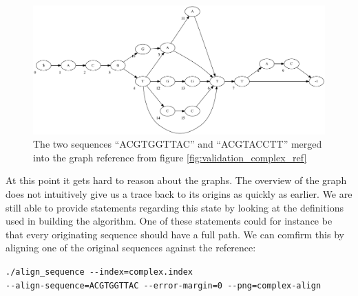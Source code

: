 \documentclass[thesis.tex]{subfiles}
\begin{document}
\begin{figure}[!h]
  \begin{mdframed}
  \includegraphics[width=\textwidth]{output/complex-merge.png}
  \caption{The two sequences ``ACGTGGTTAC'' and ``ACGTACCTT'' merged into the graph reference from figure \ref{fig:validation_complex_ref}}
  \end{mdframed}
\end{figure}
\par\noindent
At this point it gets hard to reason about the graphs. The overview of the graph does not intuitively give us a trace back to its origins as quickly as earlier. We are still able to provide statements regarding this state by looking at the definitions used in building the algorithm. One of these statements could for instance be that every originating sequence should have a full path. We can comfirm this by aligning one of the original sequences against the reference:\\
\par\noindent
\texttt{./align\_sequence -{}-index=complex.index \\
-{}-align-sequence=ACGTGGTTAC -{}-error-margin=0 -{}-png=complex-align}
\end{document}
